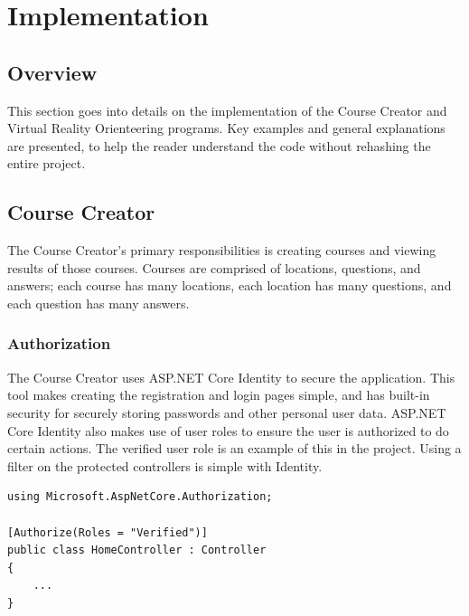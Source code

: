 \section{Implementation}																	
\label{sec:Implementation}

\subsection{Overview} 
This section goes into details on the implementation of the Course Creator and Virtual Reality Orienteering programs. Key examples and general explanations are presented, to help the reader understand the code without rehashing the entire project. 

\subsection{Course Creator}
The Course Creator's primary responsibilities is creating courses and viewing results of those courses. Courses are comprised of locations, questions, and answers; each course has many locations, each location has many questions, and each question has many answers. 

\subsubsection{Authorization}
The Course Creator uses ASP.NET Core Identity to secure the application. This tool makes creating the registration and login pages simple, and has built-in security for securely storing passwords and other personal user data. ASP.NET Core Identity also makes use of user roles to ensure the user is authorized to do certain actions. The verified user role is an example of this in the project. Using a filter on the protected controllers is simple with Identity.
\begin{lstlisting}[caption=Securing Controllers using Filter on User Role, label=lst:FilterUserRole]
using Microsoft.AspNetCore.Authorization;

[Authorize(Roles = "Verified")]
public class HomeController : Controller
{
	...
}
\end{lstlisting} 
